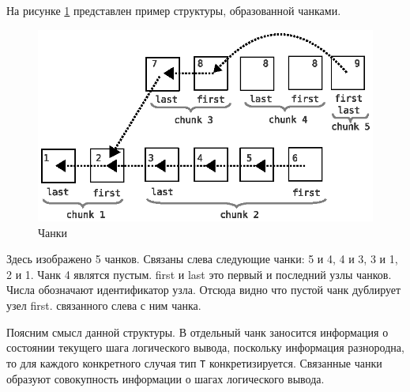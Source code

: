 На рисунке \ref{fig:chank1} представлен пример структуры, образованной чанками.

\begin{figure}[h]
	\centering
	\includegraphics[width=0.6\linewidth]{pics/ChunkFull.eps}
	\caption{Чанки}
	\label{fig:chank1}
\end{figure}

Здесь изображено 5 чанков. Связаны слева следующие чанки: 5 и 4, 4 и 3, 3 и 1, 2 и 1. Чанк 4 являтся пустым. first  и last это первый и последний узлы чанков. Числа обозначают идентификатор узла. Отсюда видно что пустой чанк дублирует узел first. связанного слева с ним чанка.




Поясним смысл данной структуры. В отдельный чанк заносится информация о состоянии текущего шага логического вывода, поскольку информация разнородна, то для каждого конкретного случая тип {\tt T} конкретизируется. Связанные чанки образуют совокупность информации о шагах логического вывода. 


